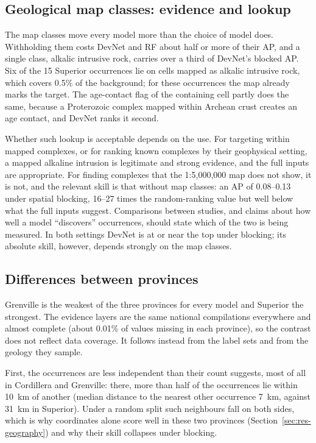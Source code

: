 \documentclass[pdflatex,sn-apa]{sn-jnl}
\begin{document}
\subsection{Geological map classes: evidence and lookup}\label{sec:disc-mapclasses}

The map classes move every model more than the choice of model does. Withholding them costs DevNet and RF about half or more of their AP, and a single class, alkalic intrusive rock, carries over a third of DevNet's blocked AP. Six of the 15 Superior occurrences lie on cells mapped as alkalic intrusive rock, which covers 0.5\% of the background; for these occurrences the map already marks the target. The age-contact flag of the containing cell partly does the same, because a Proterozoic complex mapped within Archean crust creates an age contact, and DevNet ranks it second.

Whether such lookup is acceptable depends on the use. For targeting within mapped complexes, or for ranking known complexes by their geophysical setting, a mapped alkaline intrusion is legitimate and strong evidence, and the full inputs are appropriate. For finding complexes that the 1:5,000,000 map does not show, it is not, and the relevant skill is that without map classes: an AP of 0.08--0.13 under spatial blocking, 16--27 times the random-ranking value but well below what the full inputs suggest. Comparisons between studies, and claims about how well a model ``discovers'' occurrences, should state which of the two is being measured. In both settings DevNet is at or near the top under blocking; its absolute skill, however, depends strongly on the map classes.

\subsection{Differences between provinces}\label{sec:disc-provinces}

Grenville is the weakest of the three provinces for every model and Superior the strongest. The evidence layers are the same national compilations everywhere and almost complete (about 0.01\% of values missing in each province), so the contrast does not reflect data coverage. It follows instead from the label sets and from the geology they sample.

First, the occurrences are less independent than their count suggests, most of all in Cordillera and Grenville: there, more than half of the occurrences lie within 10~km of another (median distance to the nearest other occurrence 7~km, against 31~km in Superior). Under a random split such neighbours fall on both sides, which is why coordinates alone score well in these two provinces (Section~\ref{sec:res-geography}) and why their skill collapses under blocking.
\end{document}
